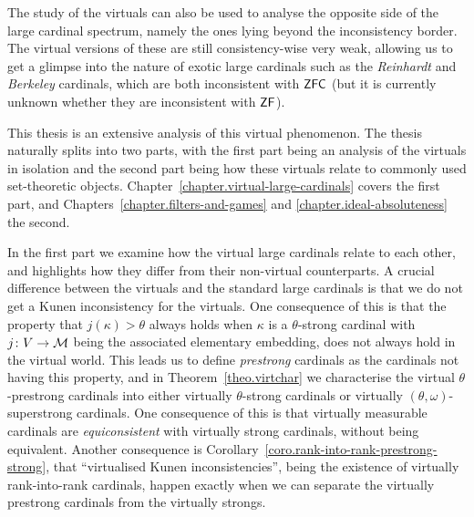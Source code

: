 \documentclass[../main]{subfiles}
\begin{document}
\begin{onehalfspacing}


The study of the virtuals can also be used to analyse the opposite side of the large cardinal spectrum, namely the ones lying beyond the inconsistency border. The virtual versions of these are still consistency-wise very weak, allowing us to get a glimpse into the nature of exotic large cardinals such as the \textit{Reinhardt} and \textit{Berkeley} cardinals, which are both inconsistent with $\textsf{ZFC}$ (but it is currently unknown whether they are inconsistent with $\textsf{ZF}$).


\quad This thesis is an extensive analysis of this virtual phenomenon. The thesis naturally splits into two parts, with the first part being an analysis of the virtuals in isolation and the second part being how these virtuals relate to commonly used set-theoretic objects. Chapter~\ref{chapter.virtual-large-cardinals} covers the first part, and Chapters~\ref{chapter.filters-and-games} and \ref{chapter.ideal-absoluteness} the second. 

\quad In the first part we examine how the virtual large cardinals relate to each other, and highlights how they differ from their non-virtual counterparts. A crucial difference between the virtuals and the standard large cardinals is that we do not get a Kunen inconsistency for the virtuals. One consequence of this is that the property that $j(\kappa)>\theta$ always holds when $\kappa$ is a $\theta$-strong cardinal with $j\colon V\to\operatorname{\mathcal M}$ being the associated elementary embedding, does not always hold in the virtual world. This leads us to define \textit{prestrong} cardinals as the cardinals not having this property, and in Theorem~\ref{theo.virtchar} we characterise the virtual $\theta$-prestrong cardinals into either virtually $\theta$-strong cardinals or virtually $(\theta,\omega)$-superstrong cardinals. One consequence of this is that virtually measurable cardinals are \textit{equiconsistent} with virtually strong cardinals, without being equivalent. Another consequence is Corollary~\ref{coro.rank-into-rank-prestrong-strong}, that ``virtualised Kunen inconsistencies'', being the existence of virtually rank-into-rank cardinals, happen exactly when we can separate the virtually prestrong cardinals from the virtually strongs.


\end{onehalfspacing}
\end{document}
